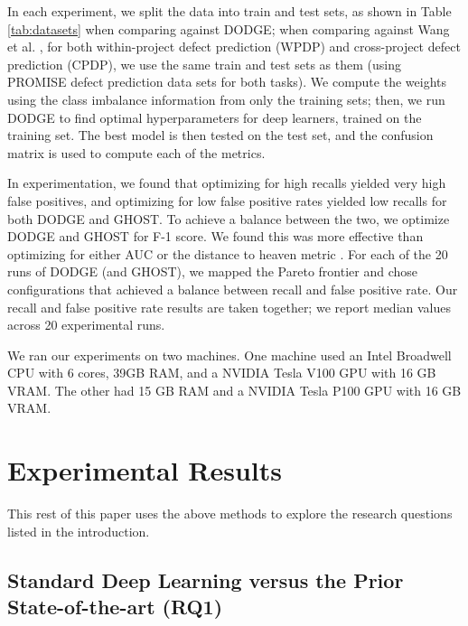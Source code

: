 \documentclass[10pt,compsoc,twocolumn]{IEEEtran}
\begin{document}
In each experiment, we split the data into train and test sets, as shown in Table \ref{tab:datasets} when comparing against DODGE; when comparing against Wang et al. \cite{wang2016automatically}, for both within-project defect prediction (WPDP) and cross-project defect prediction (CPDP), we use the same train and test sets as them (using PROMISE defect prediction data sets for both tasks). We compute the weights using the class imbalance information from only the training sets; then, we run DODGE to find optimal hyperparameters for deep learners, trained on the training set. The best model is then tested on the test set, and the confusion matrix is used to compute each of the metrics.

In experimentation, we found that optimizing for high recalls yielded very high false positives, and optimizing for low false positive rates yielded low recalls for both DODGE and GHOST. To achieve a balance between the two, we optimize DODGE and GHOST for F-1 score. We found this was more effective than optimizing for either AUC or the distance to heaven metric \cite{agrawal2019dodge}. For each of the 20 runs of DODGE (and GHOST), we mapped the Pareto frontier and chose configurations that achieved a balance between recall and false positive rate. Our recall and false positive rate results are taken together; we report median values across 20 experimental runs.

We ran our experiments on two machines. One machine used an Intel Broadwell CPU with 6 cores, 39GB RAM, and a NVIDIA Tesla V100 GPU with 16 GB VRAM. The other had 15 GB RAM and a NVIDIA Tesla P100 GPU with 16 GB VRAM.

\section{Experimental Results}

This rest of this paper uses the above methods to explore the research questions listed in
the introduction.

\subsection{Standard Deep Learning versus the Prior State-of-the-art ({\bf RQ1})}
\label{sec:rq1}
\end{document}
